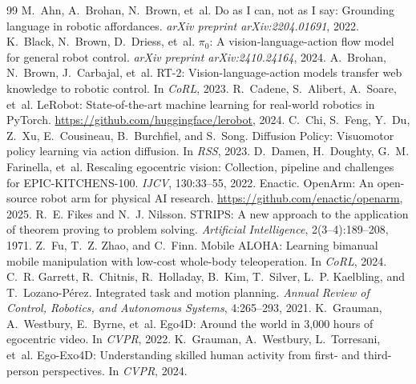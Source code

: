 \documentclass[10pt,twocolumn,letterpaper]{article}
\begin{document}
\small
\begin{thebibliography}{99}\setlength{\itemsep}{0.1em}
 M.~Ahn, A.~Brohan, N.~Brown, et~al. Do as I can, not as I say: Grounding language in robotic affordances. \emph{arXiv preprint arXiv:2204.01691}, 2022.
 K.~Black, N.~Brown, D.~Driess, et~al. $\pi_0$: A vision-language-action flow model for general robot control. \emph{arXiv preprint arXiv:2410.24164}, 2024.
 A.~Brohan, N.~Brown, J.~Carbajal, et~al. RT-2: Vision-language-action models transfer web knowledge to robotic control. In \emph{CoRL}, 2023.
 R.~Cadene, S.~Alibert, A.~Soare, et~al. LeRobot: State-of-the-art machine learning for real-world robotics in PyTorch. \url{https://github.com/huggingface/lerobot}, 2024.
 C.~Chi, S.~Feng, Y.~Du, Z.~Xu, E.~Cousineau, B.~Burchfiel, and S.~Song. Diffusion Policy: Visuomotor policy learning via action diffusion. In \emph{RSS}, 2023.
 D.~Damen, H.~Doughty, G.~M. Farinella, et~al. Rescaling egocentric vision: Collection, pipeline and challenges for EPIC-KITCHENS-100. \emph{IJCV}, 130:33--55, 2022.
 Enactic. OpenArm: An open-source robot arm for physical AI research. \url{https://github.com/enactic/openarm}, 2025.
 R.~E. Fikes and N.~J. Nilsson. STRIPS: A new approach to the application of theorem proving to problem solving. \emph{Artificial Intelligence}, 2(3--4):189--208, 1971.
 Z.~Fu, T.~Z. Zhao, and C.~Finn. Mobile ALOHA: Learning bimanual mobile manipulation with low-cost whole-body teleoperation. In \emph{CoRL}, 2024.
 C.~R. Garrett, R.~Chitnis, R.~Holladay, B.~Kim, T.~Silver, L.~P. Kaelbling, and T.~Lozano-Pérez. Integrated task and motion planning. \emph{Annual Review of Control, Robotics, and Autonomous Systems}, 4:265--293, 2021.
 K.~Grauman, A.~Westbury, E.~Byrne, et~al. Ego4D: Around the world in 3,000 hours of egocentric video. In \emph{CVPR}, 2022.
 K.~Grauman, A.~Westbury, L.~Torresani, et~al. Ego-Exo4D: Understanding skilled human activity from first- and third-person perspectives. In \emph{CVPR}, 2024.

\end{thebibliography}
\end{document}
